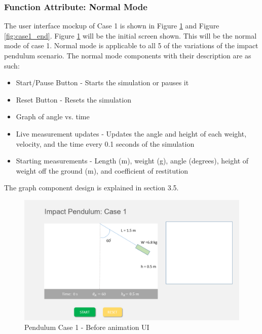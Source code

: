 \documentclass[onecolumn, draftclsnofoot,10pt, compsoc]{IEEEtran}
\begin{document}
\subsubsection{Function Attribute: Normal Mode}
The user interface mockup of Case 1 is shown in Figure \ref{fig:case1_start} and Figure \ref{fig:case1_end}. Figure \ref{fig:case1_start} will be the initial screen shown. This will be the normal mode of case 1. Normal mode is applicable to all 5 of the variations of the impact pendulum scenario. 
The normal mode components with their description are as such:
\begin{itemize}
    \item Start/Pause Button - Starts the simulation or pauses it 
    \item Reset Button - Resets the simulation
    \item Graph of angle vs. time 
    \item Live measurement updates  - Updates the angle and height of each weight, velocity, and the time every 0.1 seconds of the simulation
    \item Starting measurements  - Length (m), weight (g), angle (degrees), height of weight off the ground (m), and coefficient of restitution 
\end{itemize}

The graph component design is explained in section 3.5. \newline


\begin{figure}[H]
  \includegraphics[width=5.5 in]{pendulum_case_1_1.png}
  \caption{Pendulum Case 1 - Before animation UI}
  \label{fig:case1_start}
\end{figure}
 
\end{document}
